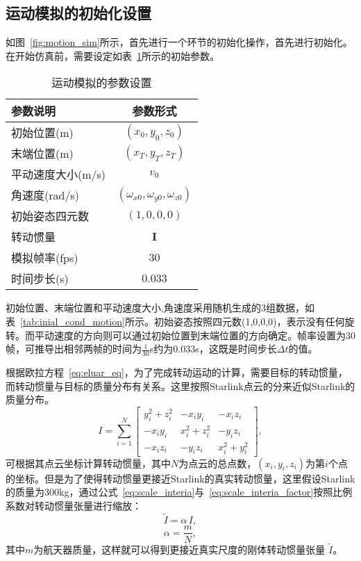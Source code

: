 \subsection{运动模拟的初始化设置}
如图~\ref{fig:motion_sim}所示，首先进行一个环节的初始化操作，首先进行初始化。在开始仿真前，需要设定如表~\ref{tab:simulation_parameters}所示的初始参数。
\begin{table}[htbp]
	\centering
	\caption{运动模拟的参数设置}
	\label{tab:simulation_parameters}
	\begin{tabular}{lc}
		\toprule
		\textbf{参数说明} & \textbf{参数形式} \\
		\midrule
		初始位置(m) & $(x_0, y_0, z_0)$ \\
		末端位置(m) & $(x_T, y_T, z_T)$ \\
		平动速度大小(m/s) & $v_0$ \\
		角速度(rad/s) & $(\omega_{x0}, \omega_{y0}, \omega_{z0})$ \\
		初始姿态四元数 & $(1, 0, 0, 0)$ \\
		转动惯量 & $\mathbf{I}$ \\
		模拟帧率(fps)& $30$ \\
		时间步长(s)& $0.033$\\
		\bottomrule
	\end{tabular}
\end{table}

初始位置、末端位置和平动速度大小,角速度采用随机生成的3组数据，如表~\ref{tab:inial_cond_motion}所示。初始姿态按照四元数(1,0,0,0)，表示没有任何旋转。而平动速度的方向则可以通过初始位置到末端位置的方向确定。帧率设置为30帧，可推导出相邻两帧的时间为$\frac{1}{30}$s约为$0.033$s，这既是时间步长$\Delta t$的值。


根据欧拉方程~\ref{eq:eluar_eq}，为了完成转动运动的计算，需要目标的转动惯量，而转动惯量与目标的质量分布有关系。这里按照Starlink点云的分来近似Starlink的质量分布。
\begin{equation}
	I =
	\sum_{i=1}^{N}
	\begin{bmatrix}
		y_i^2 + z_i^2 & -x_i y_i      & -x_i z_i \\
		-x_i y_i      & x_i^2 + z_i^2 & -y_i z_i \\
		-x_i z_i      & -y_i z_i      & x_i^2 + y_i^2
	\end{bmatrix},
\end{equation}
可根据其点云坐标计算转动惯量，其中$N$为点云的总点数，$(x_i, y_i, z_i)$为第$i$个点的坐标。但是为了使得转动惯量更接近Starlink的真实转动惯量，这里假设Starlink的质量为300kg，通过公式~\ref{eq:scale_interia}与~\ref{eq:scale_interia_factor}按照比例系数对转动惯量张量进行缩放：
\begin{equation}
	\label{eq:scale_interia}
	\widetilde{I} = \alpha \, I, 
\end{equation}
\begin{equation}
	\label{eq:scale_interia_factor}
	\alpha = \frac{m}{N},
\end{equation}
其中$m$为航天器质量，这样就可以得到更接近真实尺度的刚体转动惯量张量 $\widetilde{I}$。

